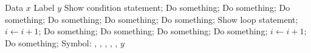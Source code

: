 \begin{algorithmic}[1]
    \REQUIRE Data $x$
    \ENSURE Label $y$
    \STATE Show condition statement;
        \STATE Do something;
    \ENDIF
        \STATE Do something;
    \ELSE
        \STATE Do something;
    \ENDIF
        \STATE Do something;
        \STATE Do something;
    \ELSE
        \STATE Do something;
    \ENDIF
    \STATE Show loop statement;
        \STATE $i \leftarrow i + 1$;
        \STATE Do something;
    \ENDFOR
        \STATE Do something;
    \ENDFOR
        \STATE Do something;
    \ENDWHILE
    \REPEAT
        \STATE Do something;
        \STATE $i \leftarrow i + 1$;
    \LOOP
        \STATE Do something;
    \ENDLOOP
    \STATE Symbol: \NOT, \AND, \OR, \XOR, \FALSE, \TRUE
    \RETURN $y$
\end{algorithmic}
